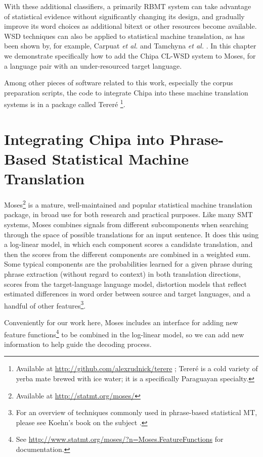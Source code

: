 With these additional classifiers, a primarily RBMT system can take advantage
of statistical evidence without significantly changing its design, and
gradually improve its word choices as additional bitext or other resources
become available.
WSD techniques can also be applied to statistical machine translation, as has
been shown by, for example, Carpuat \emph{et al.} \cite{carpuatpsd} and
Tamchyna \emph{et al.} \cite{tamchyna2014integrating}. In this chapter we
demonstrate specifically how to add the Chipa CL-WSD system to Moses, for a
language pair with an under-resourced target language.

Among other pieces of software related to this work, especially the corpus
preparation scripts, the code to integrate Chipa into these machine
translation systems is in a package called Tereré \footnote{Available at
\url{http://github.com/alexrudnick/terere} ; Tereré is a cold variety of yerba
mate brewed with ice water; it is a specifically Paraguayan specialty.}.

\section{Integrating Chipa into Phrase-Based Statistical Machine Translation}
Moses\footnote{Available at \url{http://statmt.org/moses/}} is a mature,
well-maintained and popular statistical machine translation package, in broad
use for both research and practical purposes.
Like many SMT systems, Moses combines signals from different subcomponents when
searching through the space of possible translations for an input sentence. It
does this using a log-linear model, in which each component scores a candidate
translation, and then the scores from the different components are combined in
a weighted sum. Some typical components are the probabilities learned for a
given phrase during phrase extraction (without regard to context) in both
translation directions, scores from the target-language language model,
distortion models that reflect estimated differences in word order between
source and target languages, and a handful of other features\footnote{For an
overview of techniques commonly used in phrase-based statistical MT, please see
Koehn's book on the subject \cite{koehn2010statistical}.}.

Conveniently for our work here, Moses includes an interface for adding new
feature functions\footnote{See
\url{http://www.statmt.org/moses/?n=Moses.FeatureFunctions} for documentation.}
to be combined in the log-linear model, so we can add new information to help
guide the decoding process.

